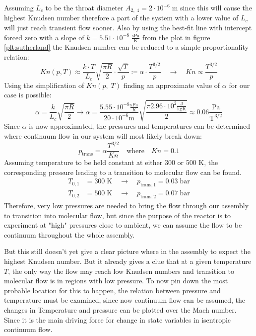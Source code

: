 	
	Assuming $L_c$ to be the throat diameter $A_{2,\;4} = 2 \cdot 10^{-6}\; \text{m}$ since this will cause the highest Knudsen number therefore a part of the system with a lower value of $L_c$ will just reach transient flow sooner.
	Also by using the best-fit line with intercept forced zero with a slope of $k = 5.51 \cdot 10^{-8} \; \frac{\text{sPa}}{\text{K}}$ from the plot in figure \ref{plt:sutherland} the Knudsen number can be reduced to a simple proportionality relation:
	\begin{equation}
		Kn(p,T) \approx
		\frac{ k \cdot T }{ L_c } \sqrt{ \frac{ \pi R}{ 2 } } \cdot \frac{ \sqrt{ T }}{ p }
		\coloneqq \alpha \cdot \frac{ T^{ 3/2 } }{ p }
		\quad \rightarrow \quad
		Kn \propto \frac{ T^{ 3/2 } }{ p }
	\end{equation}
	Using the simplification of $Kn(p,\;T)$ finding an approximate value of $\alpha$ for our case is possible:
	$$
		\alpha = \frac{k}{L_c}\sqrt{\frac{\pi R}{2}}
		\to \alpha = \frac{5.55\cdot 10^{-8} \frac{\text{sPa}}{K}}{20\cdot10^{-6}\text{m}}\sqrt{\frac{\pi 2.96\cdot 10^{2} \frac{\text{J}}{\text{kgK}}}{2}}
		\approx 0.06 \frac{\text{Pa}}{\text{T}^{3/2}}
	$$
	Since $\alpha$ is now approximated, the pressures and temperatures can be determined where continuum flow in our system will most likely break down:
	$$
		p_\text{trans} = \alpha \frac{T^{3/2}}{Kn} \quad \text{where} \quad Kn = 0.1
	$$
	Assuming temperature to be held constant at either 300 or 500 K, the corresponding pressure leading to a transition to molecular flow can be found.
	\begin{align*}
		T_{0,1} &= 300\;\text{K} \quad \to \quad p_{\text{trans},1} = 0.03\;\text{bar}\\
		T_{0,2} &= 500\;\text{K} \quad \to \quad p_{\text{trans},2} = 0.07\;\text{bar}
 	\end{align*}
	Therefore, very low pressures are needed to bring the flow through our assembly to transition into molecular flow, but since the purpose of the reactor is to experiment at "high" pressures close to ambient, we can assume the flow to be continuum throughout the whole assembly.
	
	But this still doesn't yet give a clear picture where in the assembly to expect the highest Knudsen number.
	But it already gives a clue that at a given temperature $T$, the only way the flow may reach low Knudsen numbers and transition to molecular flow is in regions with low pressure.
	To now pin down the most probable location for this to happen, the relation between pressure and temperature must be examined, since now continuum flow can be assumed, the changes in Temperature and pressure can be plotted over the Mach number.
	Since it is the main driving force for change in state variables in isentropic continuum flow.

